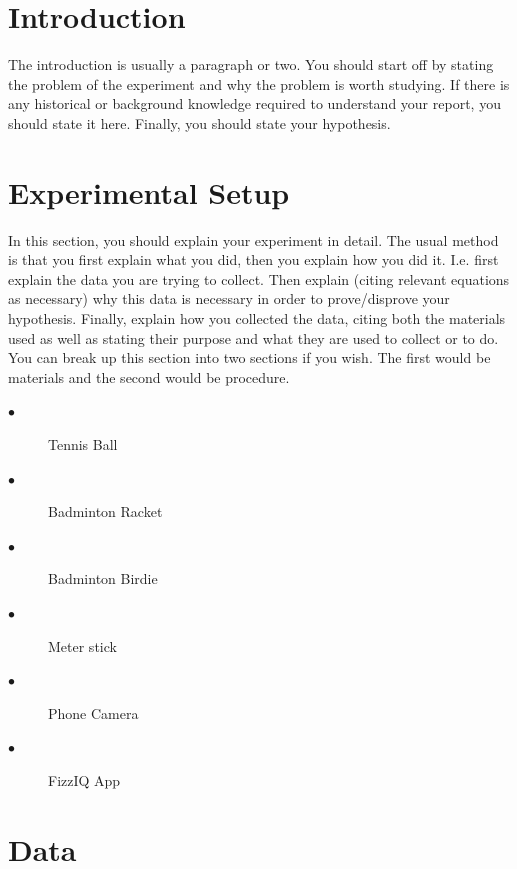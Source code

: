 \documentclass[12pt]{article}
\begin{document}
\section{Introduction}
    
    The introduction is usually a  paragraph or two. You should start off by stating the problem of the experiment and why the problem is worth studying. If there is any historical or background knowledge required to understand your report, you should state it here. Finally, you should state your hypothesis. \cite{1}
    
    

    
\section{Experimental Setup}
	In this section, you should explain your experiment in detail. The usual method is that you first explain what you did, then you explain how you did it. I.e. first explain the data you are trying to collect. Then explain (citing relevant equations as necessary) why this data is necessary in order to prove/disprove your hypothesis. Finally, explain how you collected the data, citing both the materials used as well as stating their purpose and what they are used to collect or to do. You can break up this section into two sections if you wish. The first would be materials and the second would be procedure. 

\begin{description}
  \item[$\bullet$] Tennis Ball
  \item[$\bullet$] Badminton Racket
  \item[$\bullet$] Badminton Birdie
  \item[$\bullet$] Meter stick
  \item[$\bullet$] Phone Camera
  \item[$\bullet$] FizzIQ App
\end{description}


\section{Data}
\end{document}
